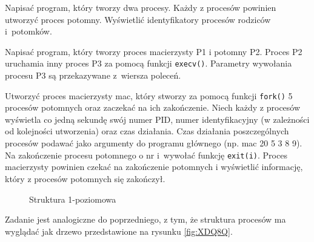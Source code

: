 \begin{myenumerate}
  \item Napisać program, który tworzy dwa procesy. Każdy z procesów powinien
        utworzyć proces potomny. Wyświetlić identyfikatory procesów rodziców
        i~potomków.
  \item Napisać program, który tworzy proces macierzysty P1 i  potomny P2.
        Proces P2 uruchamia inny proces P3 za pomocą funkcji \texttt{execv()}.
        Parametry wywołania procesu P3 są przekazywane z wiersza poleceń.
  \item Utworzyć proces macierzysty mac, który stworzy za pomocą funkcji
        \texttt{fork()} 5 procesów potomnych oraz zaczekać na ich zakończenie.
        Niech każdy z procesów wyświetla co jedną sekundę swój numer PID, numer
        identyfikacyjny (w zależności od kolejności utworzenia) oraz czas
        działania. Czas działania poszczególnych procesów podawać jako
        argumenty do programu głównego (np.  mac 20 5 3 8 9). Na zakończenie
        procesu potomnego o nr i wywołać funkcję \texttt{exit(i)}. Proces
        macierzysty powinien czekać na zakończenie potomnych i wyświetlić
        informację, który z procesów potomnych się zakończył.
        \begin{figure}[!h]
          \centering
          \caption{Struktura 1-poziomowa}
          \label{fig:YT6VA}
        \end{figure}

  \item Zadanie jest analogiczne do poprzedniego, z tym, że struktura procesów
        ma wyglądać jak drzewo przedstawione na rysunku \ref{fig:XDQ8Q}.
        \begin{figure}[!h]
          \centering
\end{figure}
\end{myenumerate}
